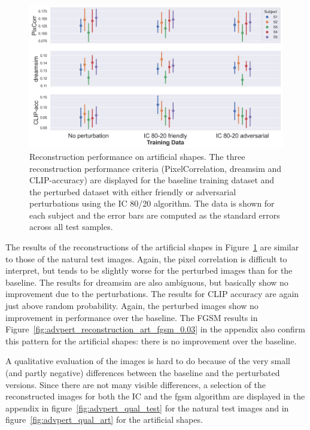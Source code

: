 \begin{figure}[ht]
    \centering
    \includegraphics[width=1\textwidth]{plots/advpert_reconstruction_art_ic_80-20.png}
    \caption[Experiment 3: Reconstruction performance on artificial shapes]{Reconstruction performance on artificial shapes. The three reconstruction performance criteria (PixelCorrelation, dreamsim and CLIP-accuracy) are displayed for the baseline training dataset and the perturbed dataset with either friendly or adversarial perturbations using the IC 80/20 algorithm. The data is shown for each subject and the error bars are computed as the standard errors across all test samples.}\label{fig:advpert_reconstruction_art_ic_80}
\end{figure}

The results of the reconstructions of the artificial shapes in Figure~\ref{fig:advpert_reconstruction_art_ic_80} are similar to those of the natural test images. Again, the pixel correlation is difficult to interpret, but tends to be slightly worse for the perturbed images than for the baseline. The results for dreamsim are also ambiguous, but basically show no improvement due to the perturbations. The results for CLIP accuracy are again just above random probability. Again, the perturbed images show no improvement in performance over the baseline. The FGSM results in Figure~\ref{fig:advpert_reconstruction_art_fgsm_0.03} in the appendix also confirm this pattern for the artificial shapes: there is no improvement over the baseline. 

A qualitative evaluation of the images is hard to do because of the very small (and partly negative) differences between the baseline and the perturbated versions. Since there are not many visible differences, a selection of the reconstructed images for both the IC and the fgsm algorithm are displayed in the appendix in figure~\ref{fig:advpert_qual_test} for the natural test images and in figure~\ref{fig:advpert_qual_art} for the artificial shapes.


